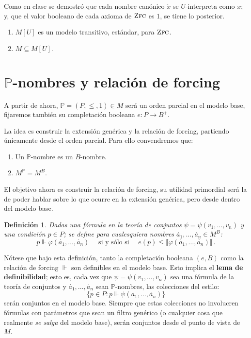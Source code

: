\documentclass[letterpaper,DIV=15,12pt]{scrartcl}
\newtheorem{definicion}{Definición}
\newcommand{\tq}{:}
\newcommand{\sii}{\quad \text{ si y sólo si } \quad}
\newcommand{\Bv}[1]{\llbracket #1 \rrbracket}
\begin{document}
    Como en clase se demostró que cada nombre canónico $\check{x}$ se $U$-interpreta como $x$; y, que el valor booleano de cada axioma de $\operatorname*{\textsc{Zfc}}$ es $1$, se tiene lo posterior.
    \begin{enumerate}
        \item $M[U]$ es un modelo transitivo, estándar, para $\operatorname*{\textsc{Zfc}}$.
        \item $M \subseteq M[U]$.
    \end{enumerate}


    \section*{$\mathbb{P}$-nombres y relación de forcing}

    A partir de ahora, $\mathbb{P}=(P,\leq,1) \in M$ será un orden parcial en el modelo base, fijaremos también su completación booleana $e:P \to B^+$. 

    La idea es construir la extensión genérica y la relación de forcing, partiendo únicamente desde el orden parcial. Para ello convendremos que:
    \begin{enumerate}
        \item Un $\mathbb{P}$-nombre es un $B$-nombre.
        \item $M^{\mathbb{P}}=M^B$.
    \end{enumerate}

    El objetivo ahora es construir la relación de forcing, su utilidad primordial será la de poder hablar sobre lo que ocurre en la extensión genérica, pero desde dentro del modelo base.

    \begin{definicion}
        Dadas una fórmula en la teoría de conjuntos $\psi=\psi(v_1, \dots, v_n)$ y una condición $p \in P$; se define para cualesquiera nombres $\dot{a_1}, \dots, \dot{a_n} \in M^B$:
        \[ p \Vdash \varphi(\dot{a_1}, \dots, \dot{a_n} ) \sii e(p) \leq \Bv{\varphi(\dot{a_1}, \dots, \dot{a_n})} \, . \]
    \end{definicion}

    Nótese que bajo esta definición, tanto la completación booleana $(e,B)$ como la relación de forcing $\Vdash$ son definibles en el modelo base. Esto implica el \textbf{lema de definibilidad}; esto es, cada vez que $\psi=\psi(v_1, \dots, v_n)$ sea una fórmula de la teoría de conjuntos y $\dot{a_1}, \dots, \dot{a_n}$ sean $\mathbb{P}$-nombres, las colecciones del estilo:
    \[ \{ p \in P \tq p \Vdash \psi (\dot{a_1}, \dots, \dot{a_n}) \} \]
    serán conjuntos en el modelo base. Siempre que estas colecciones no involucren fórmulas con parámetros que sean un filtro genérico (o cualquier cosa que realmente \textit{se salga} del modelo base), serán conjuntos desde el punto de vista de $M$.
\end{document}
